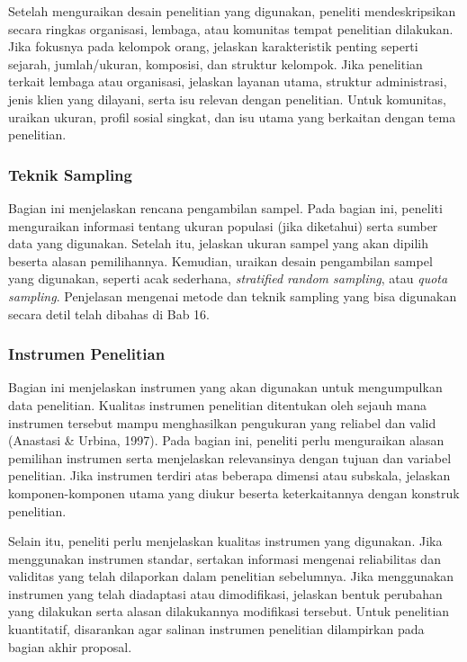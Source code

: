 \documentclass[
  indonesian,
  letterpaper,
  DIV=11,
  numbers=noendperiod]{scrreprt}
\begin{document}
Setelah menguraikan desain penelitian yang digunakan, peneliti
mendeskripsikan secara ringkas organisasi, lembaga, atau komunitas
tempat penelitian dilakukan. Jika fokusnya pada kelompok orang, jelaskan
karakteristik penting seperti sejarah, jumlah/ukuran, komposisi, dan
struktur kelompok. Jika penelitian terkait lembaga atau organisasi,
jelaskan layanan utama, struktur administrasi, jenis klien yang
dilayani, serta isu relevan dengan penelitian. Untuk komunitas, uraikan
ukuran, profil sosial singkat, dan isu utama yang berkaitan dengan tema
penelitian.

\subsubsection{Teknik Sampling}\label{teknik-sampling-1}

Bagian ini menjelaskan rencana pengambilan sampel. Pada bagian ini,
peneliti menguraikan informasi tentang ukuran populasi (jika diketahui)
serta sumber data yang digunakan. Setelah itu, jelaskan ukuran sampel
yang akan dipilih beserta alasan pemilihannya. Kemudian, uraikan desain
pengambilan sampel yang digunakan, seperti acak sederhana,
\emph{stratified random sampling}, atau \emph{quota sampling}.
Penjelasan mengenai metode dan teknik sampling yang bisa digunakan
secara detil telah dibahas di Bab 16.

\subsubsection{Instrumen Penelitian}\label{instrumen-penelitian}

Bagian ini menjelaskan instrumen yang akan digunakan untuk mengumpulkan
data penelitian. Kualitas instrumen penelitian ditentukan oleh sejauh
mana instrumen tersebut mampu menghasilkan pengukuran yang reliabel dan
valid (Anastasi \& Urbina, 1997). Pada bagian ini, peneliti perlu
menguraikan alasan pemilihan instrumen serta menjelaskan relevansinya
dengan tujuan dan variabel penelitian. Jika instrumen terdiri atas
beberapa dimensi atau subskala, jelaskan komponen-komponen utama yang
diukur beserta keterkaitannya dengan konstruk penelitian.

Selain itu, peneliti perlu menjelaskan kualitas instrumen yang
digunakan. Jika menggunakan instrumen standar, sertakan informasi
mengenai reliabilitas dan validitas yang telah dilaporkan dalam
penelitian sebelumnya. Jika menggunakan instrumen yang telah diadaptasi
atau dimodifikasi, jelaskan bentuk perubahan yang dilakukan serta alasan
dilakukannya modifikasi tersebut. Untuk penelitian kuantitatif,
disarankan agar salinan instrumen penelitian dilampirkan pada bagian
akhir proposal.
\end{document}
